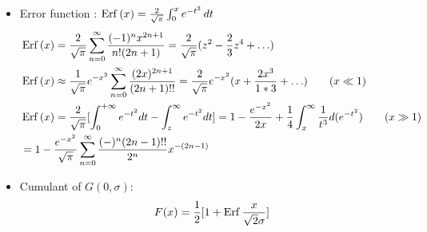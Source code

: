 \documentclass[asd-beamer.tex]{subfiles}%
\begin{document}
\begin{frame}{}
    \begin{itemize}
        \item Error function : $\operatorname{Erf}{(x)}=\frac{2}{\sqrt{\pi}}\int_0^xe^{-t^2}\,dt$
            \begin{align*}
                &\operatorname{Erf}{(x)}=\frac{2}{\sqrt{\pi}}\sum_{n=0}^{\infty}\frac{(-1)^nx^{2n+1}}{n!(2n+1)}=\frac{2}{\sqrt{\pi}}(z^2-\frac{2}{3}z^4+\ldots)\\
                &\operatorname{Erf}{(x)}\approx\frac{1}{\sqrt{\pi}}e^{-x^2}\sum_{n=0}^{\infty}\frac{(2x)^{2n+1}}{(2n+1)!!}=\frac{2}{\sqrt{\pi}}e^{-x^2}(x+\frac{2x^3}{1*3}+\ldots)\tag{$x\ll1$}\\
                &\operatorname{Erf}{(x)}=\frac{2}{\sqrt{\pi}}[\int_{0}^{+\infty}{e^{-t^2}}dt-\int_z^{\infty}e^{-t^2}dt]=1-\frac{e^{-x^2}}{2x}+\frac{1}{4}\int_x^{\infty}\frac{1}{t^3}d(e^{-t^2})\tag{$x\gg1$}\\
                &=1-\frac{e^{-x^2}}{\sqrt{\pi}}\sum_{n=0}^{\infty}\frac{(-)^n(2n-1)!!}{2^n}x^{-(2n-1)}
            \end{align*}
        \item Cumulant of $G(0,\sigma)$:
            \[F(x)=\frac{1}{2}[1+\operatorname{Erf}{\frac{x}{\sqrt{2}\sigma}}]\]
    \end{itemize}
\end{frame}
\end{document}
